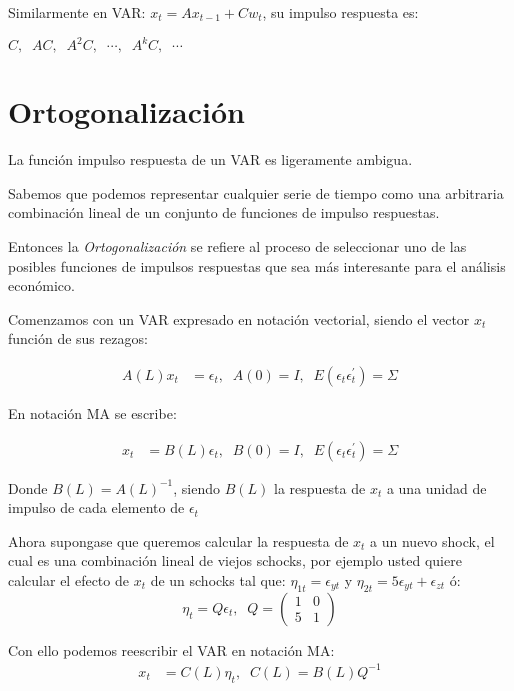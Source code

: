 \documentclass[
]{book}
\begin{document}
Similarmente en VAR: \(x_t = Ax_{t−1} + Cw_t\), su impulso respuesta es:

\(C, \;\; AC, \;\; A^{2}C, \;\; \cdots, \;\;A^{k}C, \;\;\cdots\)

\hypertarget{ortogonalizaciuxf3n}{%
\section{Ortogonalización}\label{ortogonalizaciuxf3n}}

La función impulso respuesta de un VAR es ligeramente ambigua.

Sabemos que podemos representar cualquier serie de tiempo como una arbitraria combinación lineal de un conjunto de funciones de impulso respuestas.

Entonces la \emph{Ortogonalización} se refiere al proceso de seleccionar uno de las posibles funciones de impulsos respuestas que sea más interesante para el análisis económico.

Comenzamos con un VAR expresado en notación vectorial, siendo el vector \(x_{t}\) función de sus rezagos:

\begin{align}
A(L)x_{t}&=\epsilon_{t},\;\;A(0)=I,\;\;E(\epsilon_{t}\epsilon_{t}^{'})=\Sigma 
\end{align}

En notación MA se escribe:

\begin{align}
x_{t}&=B(L)\epsilon_{t},\;\;B(0)=I,\;\;E(\epsilon_{t}\epsilon_{t}^{'})=\Sigma 
\end{align}

Donde \(B(L)=A(L)^{-1}\), siendo \(B(L)\) la respuesta de \(x_{t}\) a una unidad de impulso de cada elemento de \(\epsilon_{t}\)

Ahora supongase que queremos calcular la respuesta de \(x_{t}\) a un nuevo shock, el cual es una combinación lineal de viejos schocks, por ejemplo usted quiere calcular el efecto de \(x_{t}\) de un schocks tal que: \(\eta_{1t}=\epsilon_{yt}\) y \(\eta_{2t}=5\epsilon_{yt}+\epsilon_{zt}\) ó:
\begin{equation}
\eta_{t}=Q\epsilon_{t},\;\;Q=\left( \begin{array}{cc}
    1 & 0\\
    5 & 1
\end{array}
\right) \nonumber
\end{equation}

Con ello podemos reescribir el VAR en notación MA:
\begin{align}
x_{t}&=C(L)\eta_{t},\;\;C(L)=B(L)Q^{-1}
\end{align}
\end{document}
